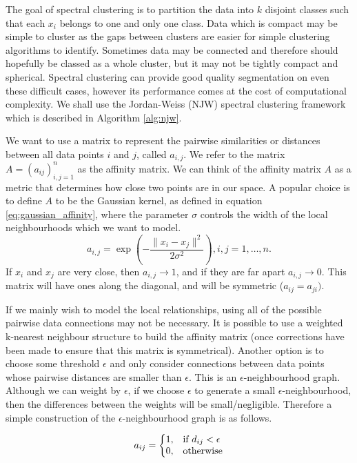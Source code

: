 \documentclass[12pt]{report}		%
\begin{document}
The goal of spectral clustering is to partition the data  into $k$ disjoint classes such that each $x_i$ belongs to one and only one class. Data which is compact may be simple to cluster as the gaps between clusters are easier for simple clustering algorithms to identify. Sometimes data may be connected and therefore should hopefully be classed as a whole cluster, but it may not be tightly compact and spherical. Spectral clustering can provide good quality segmentation on even these difficult cases, however its performance comes at the cost of computational complexity. We shall use the Jordan-Weiss (NJW) spectral clustering framework \cite{Ng2001} which is described in Algorithm \ref{alg:njw}. 

We want to use a matrix to represent the pairwise similarities or distances between all data points $i$ and $j$, called $a_{i,j}$.  We refer to the matrix $A = (a_{ij} )_{i,j = 1}^n$ as the affinity matrix.  We can think of the affinity matrix $A$  as a metric that determines how close two points are in our space. A popular choice is to define $A$ to be the Gaussian kernel, as defined in equation \ref{eq:gaussian_affinity}, where the parameter $\sigma$ controls the width of the local neighbourhoods which we want to model.
\begin{equation}
  \label{eq:gaussian_affinity}
    a_{i,j} = \exp  \left( - \frac{\| x_i - x_j \|^2}{2 \sigma^2} \right), i, j = 1, \ldots, n.
\end{equation}
 If $x_i$ and $x_j$ are very close, then $a_{i,j} \rightarrow 1 $, and if they are far apart $a_{i,j} \rightarrow 0$. This matrix will have ones along the diagonal, and will be symmetric ($a_{ij} = a_{ji})$.

If we mainly wish to model the local relationships, using all of the possible pairwise data connections may not be necessary. It is possible to use a weighted k-nearest neighbour structure to build the affinity matrix (once corrections have been made to ensure that this matrix is symmetrical). Another option is to choose some threshold $\epsilon$ and only consider connections between data points whose pairwise distances are smaller than $\epsilon$. This is an $\epsilon$-neighbourhood graph. Although we can weight by $\epsilon$, if we choose $\epsilon$ to generate a small $\epsilon$-neighbourhood, then the differences between the weights will be small/negligible. Therefore a simple construction of the $\epsilon$-neighbourhood graph is as follows. 

\begin{equation}
  a_{ij}=\left\{
  \begin{array}{@{}ll@{}}
    1, & \text{if}\ d_{ij} < \epsilon \\
    0, & \text{otherwise}
  \end{array}\right.
\end{equation} 
\end{document}
